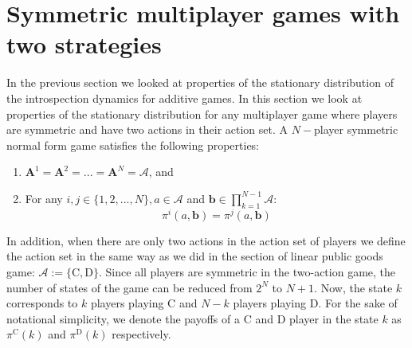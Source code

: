\documentclass[11pt]{article}
\theoremstyle{plainCl1}
\theoremstyle{plainCl2}
\newcommand{\A}{\mathbf{A}}
\newcommand{\C}{\mathrm{C}}
\newcommand{\D}{\mathrm{D}}
\begin{document}
\section*{Symmetric multiplayer games with two strategies}

In the previous section we looked at properties of the stationary distribution of the introspection dynamics for additive games. In this section we look at properties of the stationary distribution for any multiplayer game where players are symmetric and have two actions in their action set. A $N-$player symmetric normal form game satisfies the following properties: 

\begin{enumerate}
\item $\A^1 = \A^2 = ... = \A^N = \mathcal{A}$, and
\item For any $i, j \in \{1,2,...,N\}, a \in \mathcal{A}$ and $\mathbf{b} \in \displaystyle \prod_{k=1}^{N-1} \mathcal{A}$: 
\begin{equation}
\pi^i(a, \mathbf{b}) = \pi^j(a, \mathbf{b})
\end{equation}
\end{enumerate}

\noindent In addition, when there are only two actions in the action set of players we define the action set in the same way as we did in the section of linear public goods game: $\mathcal{A} := \{\C, \D\}$. Since all players are symmetric in the two-action game, the number of states of the game can be reduced from  $2^N$ to $N+1$. Now, the state $k$ corresponds to $k$ players playing $\C$ and $N-k$ players playing $\D$. For the sake of notational simplicity, we denote the payoffs of a $\C$ and $\D$ player in the state $k$ as $\pi^{\C}(k)$ and $\pi^{\D}(k)$ respectively. 
\end{document}
